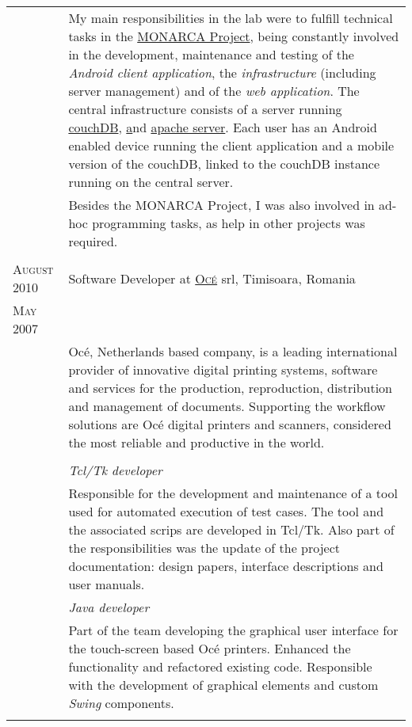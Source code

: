 \documentclass[a4paper,10pt]{article}
\begin{document}
\begin{tabular}{p{2.5cm}|p{11cm}}
 & \footnotesize{My main responsibilities in the lab were to fulfill technical
 tasks in the \href{http://www.monarca-project.eu/}{MONARCA Project}, being constantly involved in the  development, maintenance and testing of the \emph{Android client application}, the \emph{infrastructure} (including server management) and of the \emph{web application}. The central infrastructure consists of a server running \href{http://couchdb.apache.org}{couchDB}, \href{http://www.joomla.org} and \href{http://httpd.apache.org}{apache server}. Each user has an Android enabled device running the client application and a mobile version of the couchDB, linked to the couchDB instance running on the central server.}\\

& \footnotesize{Besides the MONARCA Project, I was also involved in ad-hoc programming tasks, as help in other projects was required.}\\
\multicolumn{2}{c}{} \\ 

 \raggedleft \textsc{August 2010} & Software Developer at \textsc{\href{http://www3.oce.com/ro/}{Oc\'e}} srl, Timisoara, Romania
 \\\raggedleft \textsc{May 2007}\\& 
 \footnotesize{Oc\'e, Netherlands based company, is a leading international
 provider of innovative digital printing systems, software
 and services for the production, reproduction, distribution and management of
 documents. Supporting the workflow solutions are Oc\'e digital  printers and
 scanners, considered the most reliable and productive in the world.}\\ \\ 
 &\emph{Tcl/Tk developer}\\
 &\footnotesize{Responsible for the development and maintenance of a tool
 used for automated execution of test cases. The tool and the associated scrips
 are developed in Tcl/Tk. Also part of the responsibilities was the update of
 the project documentation: design papers, interface descriptions and user
 manuals.}\\ 
 &\emph{Java developer}\\&\footnotesize{Part of the team developing the 
 graphical user interface for the touch-screen based Oc\'e printers. Enhanced
 the functionality and refactored existing code. Responsible with the development
 of graphical elements and custom \emph{Swing} components.} 
 \\\multicolumn{2}{c}{} \\ 
\end{tabular}
\end{document}
